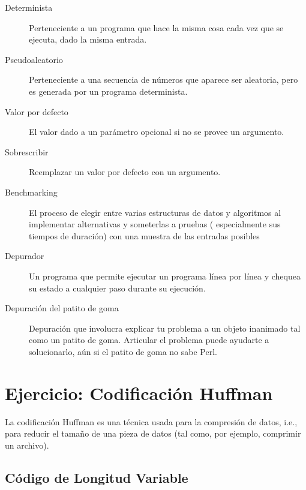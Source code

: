 \begin{description}

\item[Determinista] Perteneciente a un programa que hace la misma
cosa cada vez que se ejecuta, dado la misma entrada.

\item[Pseudoaleatorio] Perteneciente a una secuencia de números que
aparece ser aleatoria, pero es generada por un programa determinista.

\item[Valor por defecto] El valor dado a un parámetro opcional si 
no se provee un argumento.

\item[Sobrescribir] Reemplazar un valor por defecto con un argumento.

\item[Benchmarking] El proceso de elegir entre varias estructuras de datos
y algoritmos al implementar alternativas y someterlas a pruebas (
especialmente sus tiempos de duración) con una muestra de las entradas
posibles

\item[Depurador] Un programa que permite ejecutar un programa línea
por línea y chequea su estado a cualquier paso durante su ejecución.

\item[Depuración del patito de goma] Depuración que involucra 
explicar tu problema a un objeto inanimado tal como un patito de goma.
Articular el problema puede ayudarte a solucionarlo, aún si el patito
de goma no sabe Perl.

\end{description}

\section{Ejercicio: Codificación Huffman}
\label{huffman_exercise}

La codificación Huffman es una técnica usada para la compresión de
datos, i.e., para reducir el tamaño de una pieza de datos (tal
como, por ejemplo, comprimir un archivo).

\subsection{Código de Longitud Variable}

